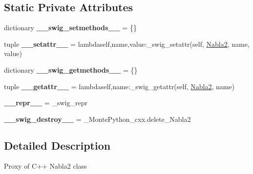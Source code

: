 \subsection*{Static Private Attributes}
\begin{DoxyCompactItemize}
\item 
\hypertarget{classMontePython__cxx_1_1Nabla2_ac7fe906f45c2baf2790e307cff0d64ed}{}dictionary {\bfseries \+\_\+\+\_\+swig\+\_\+setmethods\+\_\+\+\_\+} = \{\}\label{classMontePython__cxx_1_1Nabla2_ac7fe906f45c2baf2790e307cff0d64ed}

\item 
\hypertarget{classMontePython__cxx_1_1Nabla2_ad06fc8107d7e4ee7cdba38f239a8cbe1}{}tuple {\bfseries \+\_\+\+\_\+setattr\+\_\+\+\_\+} = lambdaself,name,value\+:\+\_\+swig\+\_\+setattr(self, \hyperlink{classMontePython__cxx_1_1Nabla2}{Nabla2}, name, value)\label{classMontePython__cxx_1_1Nabla2_ad06fc8107d7e4ee7cdba38f239a8cbe1}

\item 
\hypertarget{classMontePython__cxx_1_1Nabla2_a745f18813d642190abb32df6c21b6f46}{}dictionary {\bfseries \+\_\+\+\_\+swig\+\_\+getmethods\+\_\+\+\_\+} = \{\}\label{classMontePython__cxx_1_1Nabla2_a745f18813d642190abb32df6c21b6f46}

\item 
\hypertarget{classMontePython__cxx_1_1Nabla2_a1a51aa7005757930d634084cb00b20eb}{}tuple {\bfseries \+\_\+\+\_\+getattr\+\_\+\+\_\+} = lambdaself,name\+:\+\_\+swig\+\_\+getattr(self, \hyperlink{classMontePython__cxx_1_1Nabla2}{Nabla2}, name)\label{classMontePython__cxx_1_1Nabla2_a1a51aa7005757930d634084cb00b20eb}

\item 
\hypertarget{classMontePython__cxx_1_1Nabla2_a70ec55aafa381f6cb336160b01d1e029}{}{\bfseries \+\_\+\+\_\+repr\+\_\+\+\_\+} = \+\_\+swig\+\_\+repr\label{classMontePython__cxx_1_1Nabla2_a70ec55aafa381f6cb336160b01d1e029}

\item 
\hypertarget{classMontePython__cxx_1_1Nabla2_ab1a9fa843842e4e4c8d51ea898f3398c}{}{\bfseries \+\_\+\+\_\+swig\+\_\+destroy\+\_\+\+\_\+} = \+\_\+\+Monte\+Python\+\_\+cxx.\+delete\+\_\+\+Nabla2\label{classMontePython__cxx_1_1Nabla2_ab1a9fa843842e4e4c8d51ea898f3398c}

\end{DoxyCompactItemize}


\subsection{Detailed Description}
\begin{DoxyVerb}Proxy of C++ Nabla2 class\end{DoxyVerb}
 

